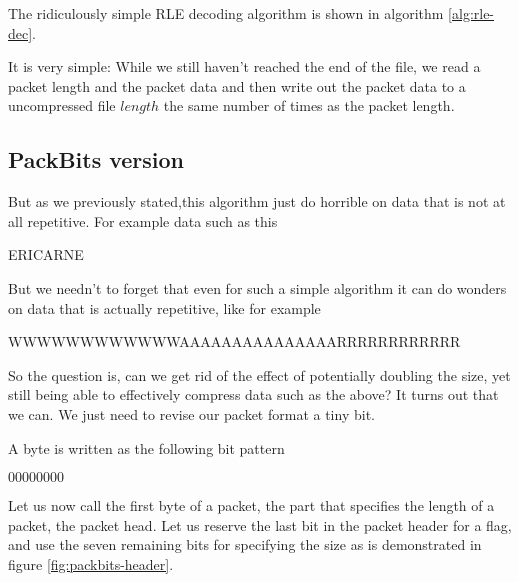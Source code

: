 \begin{refsection}
\begin{algorithm}[h]
\begin{algorithmic}[1]

    \While{\neof}
        \State {}
      \EndRepeat


    \EndWhile
  \end{algorithmic}
\end{algorithm}

The ridiculously simple RLE decoding algorithm is shown in algorithm
\ref{alg:rle-dec}.

It is very simple: While we still haven't reached the end of the file,
we read a packet length and the packet data and then write out the
packet data to a uncompressed file $length$ the same number of times
as the packet length.

\subsection{PackBits version}
\label{sec:packbits-version}



But as we previously stated,this algorithm just do horrible on data that
is not at all repetitive. For example data such as this

\begin{indentpar}
  ERICARNE
\end{indentpar}

But we needn't to forget that even for such a simple algorithm it can do
wonders on data that is actually repetitive, like for example

\begin{indentpar}
  WWWWWWWWWWWWAAAAAAAAAAAAAAARRRRRRRRRRRR
\end{indentpar}

So the question is, can we get rid of the effect of potentially
doubling the size, yet still being able to effectively compress data
such as the above?  It turns out that we can. We just need to revise
our packet format a tiny bit.

A byte is written as the following bit pattern

\begin{indentpar}
  $00000000$
\end{indentpar}

Let us now call the first byte of a packet, the part that specifies
the length of a packet, the packet head. Let us
reserve the last bit in the packet header for a flag, and use the
seven remaining bits for specifying the size as is demonstrated in
figure \ref{fig:packbits-header}.


\end{refsection}
